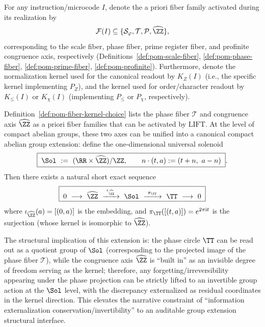 \begin{definition}\label{def:pom-fiber-kernel-choice}
For any instruction/microcode $I$, denote the a priori fiber family activated during its realization by
$$
\mathcal{F}(I)\subseteq \{\mathcal{S}_\varphi,\mathcal{T},\mathcal{P},\widehat{\ZZ}\},
$$
corresponding to the scale fiber, phase fiber, prime register fiber, and profinite congruence axis, respectively (Definitions~\ref{def:pom-scale-fiber}, \ref{def:pom-phase-fiber}, \ref{def:pom-prime-fiber}, \ref{def:pom-profinite}).
Furthermore, denote the normalization kernel used for the canonical readout by $K_Z(I)$ (i.e., the specific kernel implementing $P_Z$), and the kernel used for order/character readout by $K_{\le}(I)$ or $K_{\chi}(I)$ (implementing $P_{\le}$ or $P_\chi$, respectively).
\end{definition}

\begin{remark}\label{rem:pom-solenoid-extension}
Definition~\ref{def:pom-fiber-kernel-choice} lists the phase fiber \(\mathcal{T}\) and congruence axis \(\widehat{\ZZ}\) as a priori fiber families that can be activated by \(\mathrm{LIFT}\).
At the level of compact abelian groups, these two axes can be unified into a canonical compact abelian group extension: define the one-dimensional universal solenoid
\begin{equation}\label{eq:pom-universal-solenoid-quotient}
\boxed{\;
\Sol\ :=\ (\RR\times \widehat{\ZZ})/\ZZ,\qquad
n\cdot(t,a):=(t+n,\ a-n)\; }.
\end{equation}
Then there exists a natural short exact sequence
\begin{equation}\label{eq:pom-universal-solenoid-ses}
\boxed{\;
0\ \longrightarrow\ \widehat{\ZZ}\ \xrightarrow{\ \iota_{\widehat{\ZZ}}\ }\ \Sol\ \xrightarrow{\ \pi_{\TT}\ }\ \TT\ \longrightarrow\ 0\;}
\end{equation}
where
\(
\iota_{\widehat{\ZZ}}(a)=[(0,a)]
\)
is the embedding, and
\(
\pi_{\TT}([(t,a)])=e^{2\pi \mathrm{i}t}
\)
is the surjection (whose kernel is isomorphic to \(\widehat{\ZZ}\)).
\par
The structural implication of this extension is: the phase circle \(\TT\) can be read out as a quotient group of \(\Sol\) (corresponding to the projected image of the phase fiber \(\mathcal{T}\)), while the congruence axis \(\widehat{\ZZ}\) is ``built in'' as an invisible degree of freedom serving as the kernel; therefore, any forgetting/irreversibility appearing under the phase projection can be strictly lifted to an invertible group action at the \(\Sol\) level, with the discrepancy externalized as residual coordinates in the kernel direction.
This elevates the narrative constraint of ``information externalization conservation/invertibility'' to an auditable group extension structural interface.
\end{remark}

